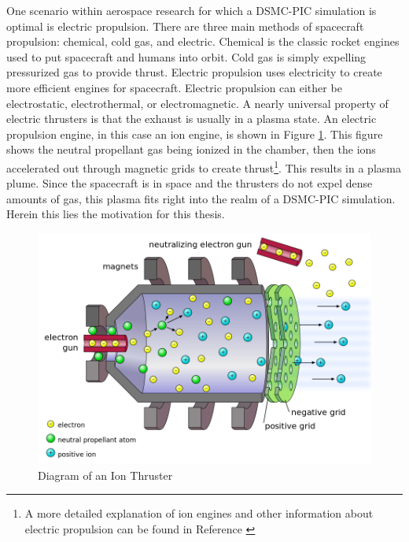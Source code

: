 \indent One scenario within aerospace research for which a DSMC-PIC simulation is optimal is electric propulsion. There are three main methods of spacecraft propulsion: chemical, cold gas, and electric. Chemical is the classic rocket engines used to put spacecraft and humans into orbit. Cold gas is simply expelling pressurized gas to provide thrust. Electric propulsion uses electricity to create more efficient engines for spacecraft. Electric propulsion can either be electrostatic, electrothermal, or electromagnetic. A nearly universal property of electric thrusters is that the exhaust is usually in a plasma state. An electric propulsion engine, in this case an ion engine, is shown in Figure \ref{fig:ion_thruster}. This figure shows the neutral propellant gas being ionized in the chamber, then the ions accelerated out through magnetic grids to create thrust\footnote{A more detailed explanation of ion engines and other information about electric propulsion can be found in Reference \cite{gobel}}. This results in a plasma plume. Since the spacecraft is in space and the thrusters do not expel dense amounts of gas, this plasma fits right into the realm of a DSMC-PIC simulation. Herein this lies the motivation for this thesis. \par


\begin{figure}
    \includegraphics[width=.85\textwidth]{figures/ion_thruster.png}
    \centering
    \caption[Diagram of an Ion Thruster]{Diagram of an Ion Thruster \cite{ion_thruster} }
    \label{fig:ion_thruster}
\end{figure}



